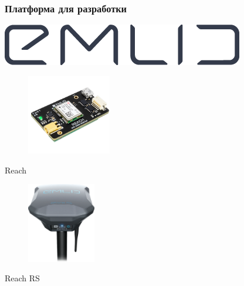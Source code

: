 \documentclass[xetex,с,aspectratio=169]{beamer}
\begin{document}
%
%
\begin{frame}
  \frametitle{Платформа для разработки}
  
  \begin{minipage}{\textwidth}
    \centering
    \includegraphics[width=.25\textwidth]{../img/emlid-logo}
    \vskip 1.25cm
    \begin{minipage}[c]{.45\textwidth}
      \centering
      \begin{figure}[h]
        \centering
        \includegraphics[height=3.5cm]{../img/reach}
      \end{figure}
      Reach
    \end{minipage}
    \hspace{1em}
    \begin{minipage}[c]{.45\textwidth}
      \centering
      \begin{figure}[h]
        \centering
        \includegraphics[height=3.5cm]{../img/reach-rs}
      \end{figure}
      Reach RS
    \end{minipage}
  \end{minipage}
\end{frame}
\end{document}

